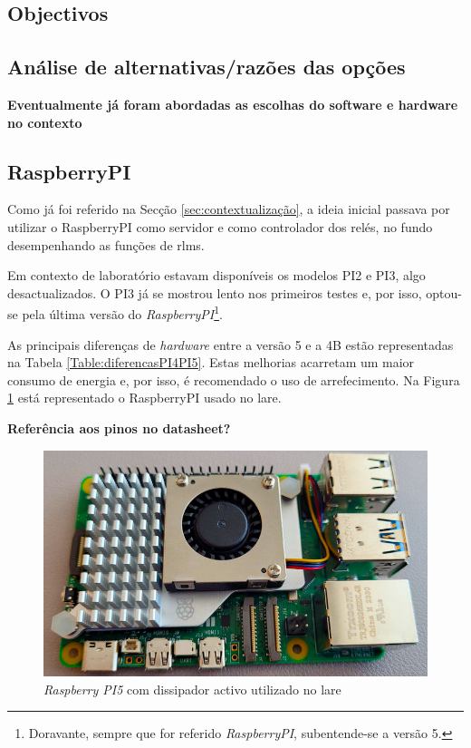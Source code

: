 \subsection{Objectivos}
\subsection{Análise de alternativas/razões das opções}
\textbf{Eventualmente já foram abordadas as escolhas do software e hardware no contexto}


\subsection{RaspberryPI}
Como já foi referido na Secção \ref{sec:contextualização}, a ideia inicial passava por utilizar o \gls{RaspberryPI} como servidor e como controlador dos relés, no fundo desempenhando as funções de \acrshort{rlms}.

Em contexto de laboratório estavam disponíveis os modelos PI2 e PI3, algo desactualizados. O PI3 já se mostrou lento nos primeiros testes e, por isso, optou-se pela última versão do \textit{RaspberryPI}\footnote{Doravante, sempre que for referido \textit{RaspberryPI}, subentende-se a versão 5.}.

As principais diferenças de \textit{hardware} entre a versão 5 e a 4B estão representadas na Tabela \ref{Table:diferencasPI4PI5}. Estas melhorias acarretam um maior consumo de energia e, por isso, é recomendado o uso de arrefecimento. Na Figura \ref{fig:pi5dissipador} está representado o \gls{RaspberryPI} usado no \acrshort{lare}.

\textbf{Referência aos pinos no datasheet?}

\begin{figure}[hbtp]
    \centering
    \includegraphics[width=1\textwidth]{figures/pi5_dissipador.png}
    \caption{\textit{Raspberry PI5} com dissipador activo utilizado no \acrshort{lare}}
    \label{fig:pi5dissipador}
\end{figure}

